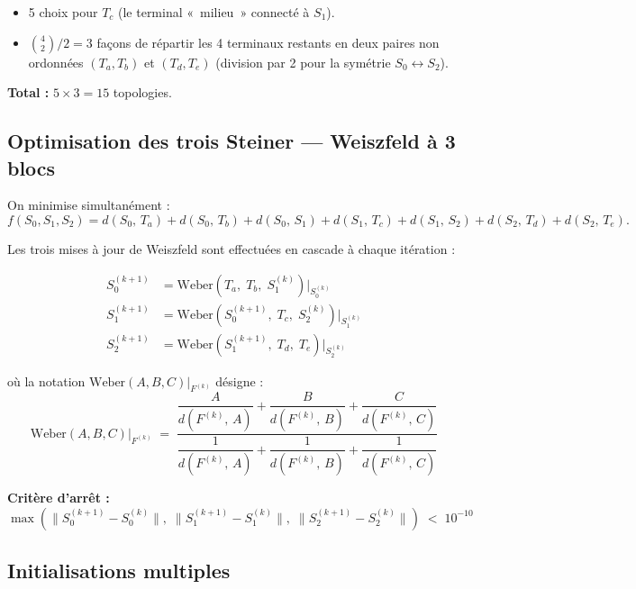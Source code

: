 \documentclass[12pt, a4paper]{article}
\newcommand{\dist}[2]{d\!\left(#1,\,#2\right)}
\begin{document}
\begin{itemize}
    \item 5 choix pour $T_c$ (le terminal «~milieu~» connecté à $S_1$).
    \item $\binom{4}{2}/2 = 3$ façons de répartir les 4 terminaux restants en deux paires
          non ordonnées $(T_a, T_b)$ et $(T_d, T_e)$ (division par 2 pour la symétrie $S_0 \leftrightarrow S_2$).
\end{itemize}

\textbf{Total :} $5 \times 3 = 15$ topologies.

\subsection{Optimisation des trois Steiner — Weiszfeld à 3 blocs}

On minimise simultanément :
\[
    f(S_0, S_1, S_2) =
    \dist{S_0}{T_a} + \dist{S_0}{T_b} + \dist{S_0}{S_1}
    + \dist{S_1}{T_c} + \dist{S_1}{S_2}
    + \dist{S_2}{T_d} + \dist{S_2}{T_e}.
\]

Les trois mises à jour de Weiszfeld sont effectuées en cascade à chaque itération :

\begin{align}
    S_0^{(k+1)} &= \text{Weber}\!\left(T_a,\; T_b,\; S_1^{(k)}\right)
    \Big|_{S_0^{(k)}}
    \label{eq:s0} \\[8pt]
    S_1^{(k+1)} &= \text{Weber}\!\left(S_0^{(k+1)},\; T_c,\; S_2^{(k)}\right)
    \Big|_{S_1^{(k)}}
    \label{eq:s1} \\[8pt]
    S_2^{(k+1)} &= \text{Weber}\!\left(S_1^{(k+1)},\; T_d,\; T_e\right)
    \Big|_{S_2^{(k)}}
    \label{eq:s2}
\end{align}

où la notation $\text{Weber}(A, B, C)\big|_{F^{(k)}}$ désigne :
\[
    \text{Weber}(A, B, C)\Big|_{F^{(k)}}
    \;=\;
    \frac{\dfrac{A}{\dist{F^{(k)}}{A}}
        + \dfrac{B}{\dist{F^{(k)}}{B}}
        + \dfrac{C}{\dist{F^{(k)}}{C}}}
         {\dfrac{1}{\dist{F^{(k)}}{A}}
        + \dfrac{1}{\dist{F^{(k)}}{B}}
        + \dfrac{1}{\dist{F^{(k)}}{C}}}
\]

\textbf{Critère d'arrêt :}
\[
    \max\!\left(
        \|S_0^{(k+1)} - S_0^{(k)}\|,\;
        \|S_1^{(k+1)} - S_1^{(k)}\|,\;
        \|S_2^{(k+1)} - S_2^{(k)}\|
    \right) \;<\; 10^{-10}
\]

\subsection{Initialisations multiples}
\end{document}
